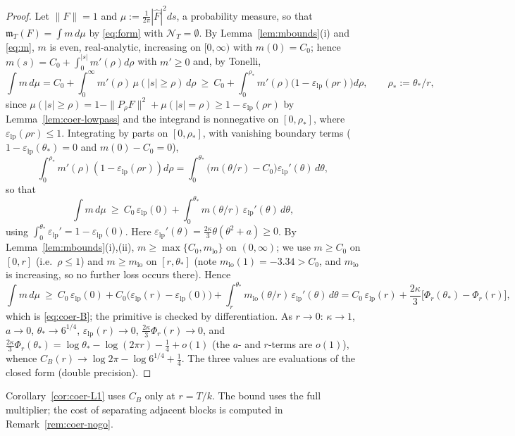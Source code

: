 \documentclass[10pt]{amsart}
\theoremstyle{definition}
\theoremstyle{remark}
\newcommand{\Fh}{\widehat F}
\newcommand{\NT}{\mathcal N_T}
\newcommand{\mT}{\mathfrak m_T}
\begin{document}
\begin{proof}
Let $\|F\|=1$ and $\mu:=\frac1{2\pi}|\Fh|^2ds$, a probability measure, so that $\mT(F)=\int m\,d\mu$ by
\eqref{eq:form} with $\NT=\emptyset$. By Lemma~\ref{lem:mbounds}(i) and \eqref{eq:m}, $m$ is even, real-analytic,
increasing on $[0,\infty)$ with $m(0)=C_0$; hence $m(s)=C_0+\int_0^{|s|}m'(\rho)d\rho$ with $m'\ge0$ and, by Tonelli,
\[
\int m\,d\mu=C_0+\int_0^\infty m'(\rho)\,\mu(|s|\ge\rho)\,d\rho\ \ge\ C_0+\int_0^{\rho_*}m'(\rho)\big(1-\varepsilon_{\mathrm{lp}}(\rho r)\big)d\rho,
\qquad\rho_*:=\theta_*/r,
\]
since $\mu(|s|\ge\rho)=1-\|P_{\rho}F\|^2+\mu(|s|=\rho)\ge1-\varepsilon_{\mathrm{lp}}(\rho r)$ by Lemma~\ref{lem:coer-lowpass} and the
integrand is nonnegative on $[0,\rho_*]$, where $\varepsilon_{\mathrm{lp}}(\rho r)\le1$. Integrating by parts on $[0,\rho_*]$, with
vanishing boundary terms ($1-\varepsilon_{\mathrm{lp}}(\theta_*)=0$ and $m(0)-C_0=0$),
\[
\int_0^{\rho_*}m'(\rho)(1-\varepsilon_{\mathrm{lp}}(\rho r))d\rho=\int_0^{\theta_*}\big(m(\theta/r)-C_0\big)\varepsilon_{\mathrm{lp}}'(\theta)\,d\theta,
\]
so that
\[
\int m\,d\mu\ \ge\ C_0\,\varepsilon_{\mathrm{lp}}(0)+\int_0^{\theta_*}m(\theta/r)\,\varepsilon_{\mathrm{lp}}'(\theta)\,d\theta ,
\]
using $\int_0^{\theta_*}\varepsilon_{\mathrm{lp}}'=1-\varepsilon_{\mathrm{lp}}(0)$. Here $\varepsilon_{\mathrm{lp}}'(\theta)=\frac{2\kappa}3\theta(\theta^2+a)\ge0$. By
Lemma~\ref{lem:mbounds}(i),(ii), $m\ge\max\{C_0,m_{\mathrm{lo}}\}$ on $(0,\infty)$; we use $m\ge C_0$ on $[0,r]$ (i.e.\ $\rho\le1$)
and $m\ge m_{\mathrm{lo}}$ on $[r,\theta_*]$ (note $m_{\mathrm{lo}}(1)=-3.34>C_0$, and $m_{\mathrm{lo}}$ is increasing, so no further loss occurs
there). Hence
\[
\int m\,d\mu\ \ge\ C_0\,\varepsilon_{\mathrm{lp}}(0)+C_0\big(\varepsilon_{\mathrm{lp}}(r)-\varepsilon_{\mathrm{lp}}(0)\big)+\int_r^{\theta_*}m_{\mathrm{lo}}(\theta/r)\,\varepsilon_{\mathrm{lp}}'(\theta)\,d\theta
=C_0\,\varepsilon_{\mathrm{lp}}(r)+\frac{2\kappa}3\big[\Phi_r(\theta_*)-\Phi_r(r)\big],
\]
which is \eqref{eq:coer-B}; the primitive is checked by differentiation. As $r\to0$: $\kappa\to1$, $a\to0$,
$\theta_*\to6^{1/4}$, $\varepsilon_{\mathrm{lp}}(r)\to0$, $\frac{2\kappa}3\Phi_r(r)\to0$, and
$\frac{2\kappa}3\Phi_r(\theta_*)=\log\theta_*-\log(2\pi r)-\frac14+o(1)$ (the $a$- and $r$-terms are $o(1)$),
whence $C_B(r)\to\log2\pi-\log6^{1/4}+\frac14$. The three values are evaluations of the closed form (double precision).
\end{proof}

Corollary~\ref{cor:coer-L1} uses $C_B$ only at $r=T/k$. The bound
uses the full multiplier; the cost of separating adjacent blocks
is computed in Remark~\ref{rem:coer-nogo}.
\end{document}
